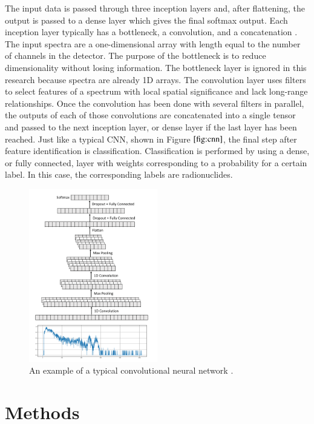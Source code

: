 \documentclass[fleqn]{anstrans}
\begin{document}
The input data is passed through three inception layers and, after flattening, the output is passed to a dense layer which gives the final softmax output. 
Each inception layer typically has a bottleneck, a convolution, and a concatenation \cite{szegedyGoingDeeperConvolutions2014} \cite{szegedyRethinkingInceptionArchitecture2015}.
The input spectra are a one-dimensional array with length equal to the number of channels in the detector. The purpose of the bottleneck is to reduce dimensionality without losing information. The bottleneck layer is ignored in this research because spectra are already 1D arrays.   
The convolution layer uses filters to select features of a spectrum with local spatial significance and lack long-range relationships. 
Once the convolution has been done with several filters in parallel, the outputs of each of those convolutions are concatenated into a single tensor and passed to the next inception layer, or dense layer if the last layer has been reached. 
Just like a typical CNN, shown in Figure $\ref{fig:cnn}$, the final step after feature identification is classification. 
Classification is performed by using a dense, or fully connected, layer with weights corresponding to a probability for a certain label. 
In this case, the corresponding labels are radionuclides.

\begin{figure}[ht]
	\centering
	\includegraphics[width=0.5\textwidth]{../figures/cnn-figure.png}
	\caption{An example of a typical convolutional neural network \cite{kamudaComparisonMachineLearning2018a}.}
	\label{fig:cnn}
\end{figure}

\section{Methods}
\end{document}
